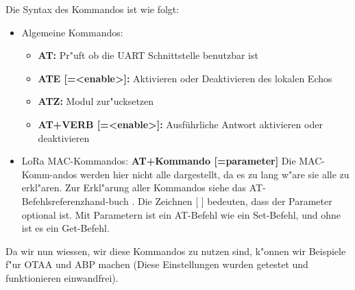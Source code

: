 Die Syntax des Kommandos ist wie folgt: 
 
 \begin{itemize}
 	\item Algemeine Kommandos: 
 	\begin{itemize}
 		\item \textbf{AT:} Pr"uft ob die UART Schnittstelle benutzbar ist
 		\item \textbf{ATE [=<enable>]:}  Aktivieren oder Deaktivieren
 		des lokalen Echos
 		\item \textbf{ATZ:} Modul zur"ucksetzen
 		\item \textbf{AT+VERB [=<enable>]:} Ausführliche Antwort
 		aktivieren oder deaktivieren 
 	\end{itemize}
 	\item LoRa MAC-Kommandos: \textbf{AT+Kommando [=parameter]}
 	Die MAC-Komm-andos werden hier nicht alle dargestellt, da es zu lang
 	w"are sie alle zu erkl"aren. Zur Erkl"arung aller Kommandos siehe
 	das AT-Befehlsreferenzhand-buch \cite{AT_Command}.
 	Die Zeichnen [ ] bedeuten, dass der Parameter optional ist. Mit
 	Parametern ist ein AT-Befehl wie ein Set-Befehl, und ohne ist es ein
 	Get-Befehl.
 \end{itemize}  

Da wir nun wiessen, wir diese Kommandos zu nutzen sind, k"onnen wir 
Beispiele f"ur OTAA und ABP machen (Diese Einstellungen wurden getestet
und funktionieren einwandfrei).

